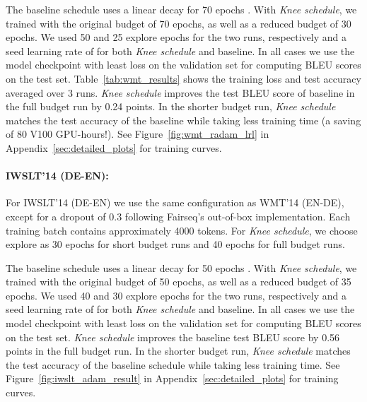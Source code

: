 \documentclass[twoside,11pt]{article}
\newcommand{\lrschedule}{\textit{Knee schedule}}
\begin{document}
The baseline schedule uses a linear decay for 70 epochs \citep{liu2019variance_radam}. With \lrschedule{}, we trained with the original budget of 70 epochs, as well as a reduced budget of 30 epochs. We used 50 and 25 explore epochs for the two runs, respectively and a seed learning rate of  for both \lrschedule{} and baseline. In all cases we use the model checkpoint with least loss on the validation set for computing BLEU scores on the test set. Table~\ref{tab:wmt_results} shows the training loss and test accuracy averaged over 3 runs. \lrschedule{} improves the test BLEU score of baseline in the full budget run by 0.24 points. In the shorter budget run, \lrschedule{} matches the test accuracy of the baseline while taking  less training time (a saving of 80 V100 GPU-hours!). See Figure~\ref{fig:wmt_radam_lrl} in Appendix~\ref{sec:detailed_plots} for training curves.



\paragraph{IWSLT'14 (DE-EN):} For IWSLT'14 (DE-EN) we use the same configuration as WMT'14 (EN-DE), except for a dropout of 0.3 following Fairseq's out-of-box implementation. Each training batch contains approximately 4000 tokens. For \lrschedule{}, we choose explore as 30 epochs for short budget runs and 40 epochs for full budget runs.

The baseline schedule uses a linear decay for 50 epochs \citep{liu2019variance_radam}. With \lrschedule{}, we trained with the original budget of 50 epochs, as well as a reduced budget of 35 epochs. We used 40 and 30 explore epochs for the two runs, respectively and a seed learning rate of  for both \lrschedule{} and baseline. In all cases we use the model checkpoint with least loss on the validation set for computing BLEU scores on the test set. \lrschedule{} improves the baseline test BLEU score by 0.56 points in the full budget run. In the shorter budget run, \lrschedule{} matches the test accuracy of the baseline schedule while taking  less training time. See Figure~\ref{fig:iwslt_adam_result} in Appendix~\ref{sec:detailed_plots} for training curves.
\end{document}
